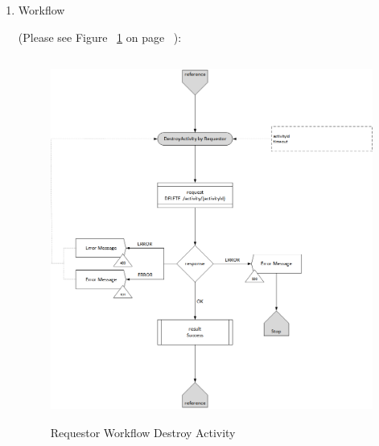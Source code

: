 \begin{enumerate}
\item Workflow

(Please see Figure ~\ref{fig:RDA} on page ~\pageref{fig:RDA}):

\begin{figure}[H]
    \centering
    \includegraphics[width=12cm,height=12cm,angle=0]{./diag/Workflow/Activity/DestroyActivity-R-Workflow.png}
    \caption{Requestor Workflow Destroy Activity }
	\label{fig:RDA}
\end{figure}


\end{enumerate}

\newpage



